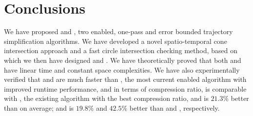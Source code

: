 \section{Conclusions} %

We have proposed \cist and \cista, two \sed enabled, one-pass and error bounded trajectory simplification algorithms.
%
We have developed a novel spatio-temporal cone intersection approach and a fast circle intersection checking method, based on which we then have designed \cist and \cista.
%
We have theoretically proved that both \cist and \cista have linear time and constant space complexities.
%
We have also experimentally verified that \cist and \cista are much faster than \squishe, the most current \sed enabled \lsa algorithm with improved runtime performance,
and in terms of compression ratio, \cist is \textcolor[rgb]{1.00,0.00,0.00}{comparable} with \dpa, the existing \lsa algorithm with the best compression ratio, and is $21.3\%$ better than \squishe on average; and \cista is {$19.8\%$} and {$42.5\%$} better than \dps and \squishe, respectively.
